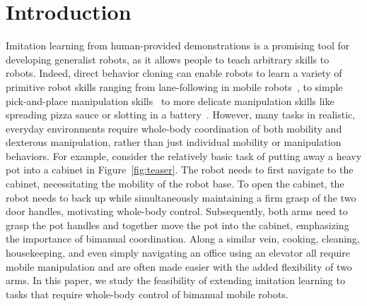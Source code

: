 \documentclass[11pt, a4paper, logo, twocolumn]{stanford}
\begin{document}
\section{Introduction}
\label{sec:intro}
Imitation learning from human-provided demonstrations is a promising tool for developing generalist robots, as it allows people to teach arbitrary skills to robots. Indeed, direct behavior cloning can enable robots to learn a variety of primitive robot skills ranging from lane-following in mobile robots~\cite{Pomerleau1988ALVINNAA}, to simple pick-and-place manipulation skills~\cite{rt12022arxiv,open_x_embodiment_rt_x_2023} to more delicate manipulation skills like spreading pizza sauce or slotting in a battery~\cite{chi2023diffusionpolicy,zhao2023learning}. However, many tasks in realistic, everyday environments require whole-body coordination of both mobility and dexterous manipulation, rather than just individual mobility or manipulation behaviors. For example, consider the relatively basic task of putting away a heavy pot into a cabinet in Figure~\ref{fig:teaser}. The robot needs to first navigate to the cabinet, necessitating the mobility of the robot base. To open the cabinet, the robot needs to back up while simultaneously maintaining a firm grasp of the two door handles, motivating whole-body control. Subsequently, both arms need to grasp the pot handles and together move the pot into the cabinet, emphasizing the importance of bimanual coordination. Along a similar vein, cooking, cleaning, housekeeping, and even simply navigating an office using an elevator all require mobile manipulation and are often made easier with the added flexibility of two arms. In this paper, we study the feasibility of extending imitation learning to tasks that require whole-body control of bimanual mobile robots.
\end{document}
